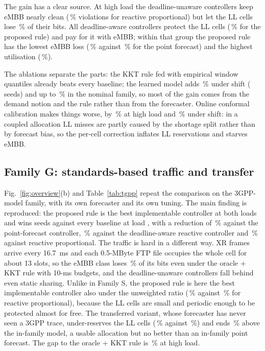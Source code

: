 \documentclass[conference]{IEEEtran}
\begin{document}
The gain has a clear source. At high load the deadline-unaware controllers keep eMBB nearly clean (\meanhighreactivepropEMBB{}\,\% violations for reactive proportional) but let the LL cells lose \meanhighreactivepropLL{}\,\% of their bits. All deadline-aware controllers protect the LL cells (\meanhighproposedLL{}\,\% for the proposed rule) and pay for it with eMBB; within that group the proposed rule has the lowest eMBB loss (\meanhighproposedEMBB{}\,\% against \meanhighpointforecastEMBB{}\,\% for the point forecast) and the highest utilisation (\meanhighproposedUtil{}\,\%).

The ablations separate the parts: the KKT rule fed with empirical window quantiles already beats every baseline; the learned model adds \redshiftproposedwindow{}\,\% under shift (\redshiftproposedwindowWins{} seeds) and up to \redlowproposedwindow{}\,\% in the nominal family, so most of the gain comes from the demand notion and the rule rather than from the forecaster. Online conformal calibration makes things worse, by \redhighproposedcal{}\,\% at high load and \redshiftproposedcal{}\,\% under shift: in a coupled allocation LL misses are partly caused by the shortage split rather than by forecast bias, so the per-cell correction inflates LL reservations and starves eMBB.

\subsection{Family G: standards-based traffic and transfer}
\label{sec:tgpp}
Fig.~\ref{fig:overview}(b) and Table~\ref{tab:tgpp} repeat the comparison on the 3GPP-model family, with its own forecaster and its own tuning. The main finding is reproduced: the proposed rule is the best implementable controller at both loads and wins \redtgpphighpointforecastWins{} seeds against every baseline at load \loadTgppHigh{}, with a reduction of \redtgpphighpointforecast{}\,\% against the point-forecast controller, \redtgpphighqueueaware{}\,\% against the deadline-aware reactive controller and \redtgpphighreactiveprop{}\,\% against reactive proportional. The traffic is hard in a different way. XR frames arrive every 16.7~ms and each 0.5-MByte FTP file occupies the whole cell for about 13 slots, so the eMBB class loses \meantgpphighoraclekktEMBB{}\,\% of its bits even under the oracle + KKT rule with 10-ms budgets, and the deadline-unaware controllers fall behind even static sharing. Unlike in Family S, the proposed rule is here the best implementable controller also under the unweighted ratio (\meantgpphighproposedUnw{}\,\% against \meantgpphighreactivepropUnw{}\,\% for reactive proportional), because the LL cells are small and periodic enough to be protected almost for free. The transferred variant, whose forecaster has never seen a 3GPP trace, under-reserves the LL cells (\meantgpphighproposedtransferLL{}\,\% against \meantgpphighproposedLL{}\,\%) and ends \redtgpphighproposedtransfer{}\,\% above the in-family model, a usable allocation but no better than an in-family point forecast. The gap to the oracle + KKT rule is \gapKKTtgpphigh{}\,\% at high load.
\end{document}
